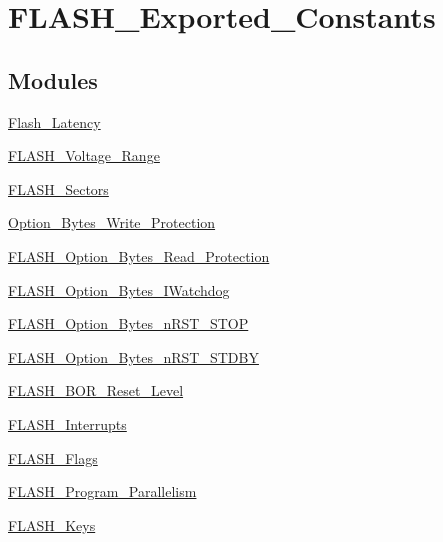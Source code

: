 \hypertarget{group___f_l_a_s_h___exported___constants}{\section{F\-L\-A\-S\-H\-\_\-\-Exported\-\_\-\-Constants}
\label{group___f_l_a_s_h___exported___constants}
}
\subsection*{Modules}
\begin{DoxyCompactItemize}
\item 
\hyperlink{group___flash___latency}{Flash\-\_\-\-Latency}
\item 
\hyperlink{group___f_l_a_s_h___voltage___range}{F\-L\-A\-S\-H\-\_\-\-Voltage\-\_\-\-Range}
\item 
\hyperlink{group___f_l_a_s_h___sectors}{F\-L\-A\-S\-H\-\_\-\-Sectors}
\item 
\hyperlink{group___option___bytes___write___protection}{Option\-\_\-\-Bytes\-\_\-\-Write\-\_\-\-Protection}
\item 
\hyperlink{group___f_l_a_s_h___option___bytes___read___protection}{F\-L\-A\-S\-H\-\_\-\-Option\-\_\-\-Bytes\-\_\-\-Read\-\_\-\-Protection}
\item 
\hyperlink{group___f_l_a_s_h___option___bytes___i_watchdog}{F\-L\-A\-S\-H\-\_\-\-Option\-\_\-\-Bytes\-\_\-\-I\-Watchdog}
\item 
\hyperlink{group___f_l_a_s_h___option___bytes__n_r_s_t___s_t_o_p}{F\-L\-A\-S\-H\-\_\-\-Option\-\_\-\-Bytes\-\_\-n\-R\-S\-T\-\_\-\-S\-T\-O\-P}
\item 
\hyperlink{group___f_l_a_s_h___option___bytes__n_r_s_t___s_t_d_b_y}{F\-L\-A\-S\-H\-\_\-\-Option\-\_\-\-Bytes\-\_\-n\-R\-S\-T\-\_\-\-S\-T\-D\-B\-Y}
\item 
\hyperlink{group___f_l_a_s_h___b_o_r___reset___level}{F\-L\-A\-S\-H\-\_\-\-B\-O\-R\-\_\-\-Reset\-\_\-\-Level}
\item 
\hyperlink{group___f_l_a_s_h___interrupts}{F\-L\-A\-S\-H\-\_\-\-Interrupts}
\item 
\hyperlink{group___f_l_a_s_h___flags}{F\-L\-A\-S\-H\-\_\-\-Flags}
\item 
\hyperlink{group___f_l_a_s_h___program___parallelism}{F\-L\-A\-S\-H\-\_\-\-Program\-\_\-\-Parallelism}
\item 
\hyperlink{group___f_l_a_s_h___keys}{F\-L\-A\-S\-H\-\_\-\-Keys}
\end{DoxyCompactItemize}
